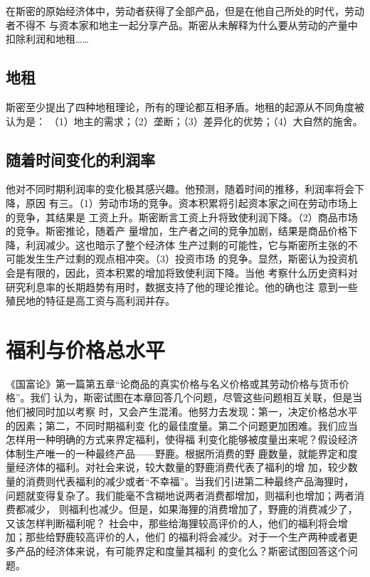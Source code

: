 在斯密的原始经济体中，劳动者获得了全部产品，但是在他自己所处的时代，劳动者不得不
与资本家和地主一起分享产品。斯密从未解释为什么要从劳动的产量中扣除利润和地租……

\subsection{地租}

斯密至少提出了四种地租理论，所有的理论都互相矛盾。地租的起源从不同角度被认为是：
（1）地主的需求；（2）垄断；（3）差异化的优势；（4）大自然的施舍。

\subsection{随着时间变化的利润率}

他对不同时期利润率的变化极其感兴趣。他预测，随着时间的推移，利润率将会下降，原因
有三。（1）劳动市场的竞争。资本积累将引起资本家之间在劳动市场上的竞争，其结果是
工资上升。斯密断言工资上升将致使利润下降。（2）商品市场的竞争。斯密推论，随着产
量增加，生产者之间的竞争加剧，结果是商品价格下降，利润减少。这也暗示了整个经济体
生产过剩的可能性，它与斯密所主张的不可能发生生产过剩的观点相冲突。（3）投资市场
的竞争。显然，斯密认为投资机会是有限的，因此，资本积累的增加将致使利润下降。当他
考察什么历史资料对研究利息率的长期趋势有用时，数据支持了他的理论推论。他的确也注
意到一些殖民地的特征是高工资与高利润并存。


\section{福利与价格总水平}

《国富论》第一篇第五章“论商品的真实价格与名义价格或其劳动价格与货币价格”。我们
认为，斯密试图在本章回答几个问题，尽管这些问题相互关联，但是当他们被同时加以考察
时，又会产生混淆。他努力去发现：第一，决定价格总水平的因素；第二，不同时期福利变
化的最佳度量。第二个问题更加困难。我们应当怎样用一种明确的方式来界定福利，使得福
利变化能够被度量出来呢？假设经济体制生产唯一的一种最终产品——野鹿。根据所消费的野
鹿数量，就能界定和度量经济体的福利。对社会来说，较大数量的野鹿消费代表了福利的增
加，较少数量的消费则代表福利的减少或者“不幸福”。当我们引进第二种最终产品海狸时，
问题就变得复杂了。我们能毫不含糊地说两者消费都增加，则福利也增加；两者消费都减少，
则福利也减少。但是，如果海狸的消费增加了，野鹿的消费减少了，又该怎样判断福利呢？
社会中，那些给海狸较高评价的人，他们的福利将会增加；那些给野鹿较高评价的人，他们
的福利将会减少。对于一个生产两种或者更多产品的经济体来说，有可能界定和度量其福利
的变化么？斯密试图回答这个问题。

